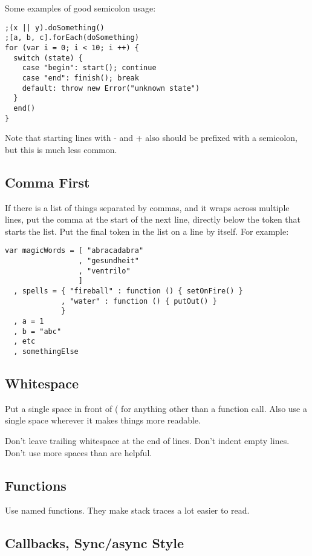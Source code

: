Some examples of good semicolon usage:

\lstset{language=Javascript,caption=Good semicolon usage}
\begin{lstlisting}
;(x || y).doSomething()
;[a, b, c].forEach(doSomething)
for (var i = 0; i < 10; i ++) {
  switch (state) {
    case "begin": start(); continue
    case "end": finish(); break
    default: throw new Error("unknown state")
  }
  end()
}
\end{lstlisting}

Note that starting lines with - and + also should be prefixed with a semicolon, but this is much less common.

\subsection{Comma First}

If there is a list of things separated by commas, and it wraps across multiple lines, put the comma at the start of the next line, directly below the token that starts the list. Put the final token in the list on a line by itself. For example:

\lstset{language=Javascript,caption=Comma first}
\begin{lstlisting}
var magicWords = [ "abracadabra"
                 , "gesundheit"
                 , "ventrilo"
                 ]
  , spells = { "fireball" : function () { setOnFire() }
             , "water" : function () { putOut() }
             }
  , a = 1
  , b = "abc"
  , etc
  , somethingElse
\end{lstlisting}

\subsection{Whitespace}

Put a single space in front of ( for anything other than a function call. Also use a single space wherever it makes things more readable.

Don't leave trailing whitespace at the end of lines. Don't indent empty lines. Don't use more spaces than are helpful.

\subsection{Functions}

Use named functions. They make stack traces a lot easier to read.

\subsection{Callbacks, Sync/async Style}

